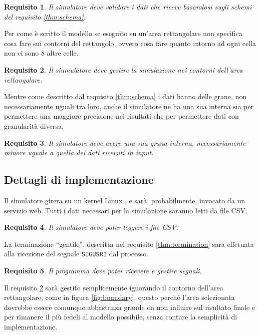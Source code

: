 \documentclass[draft]{article}
\newcommand{\eng}[1]{\foreignlanguage{english}{#1}} %
\newtheorem{requirement}{Requisito}
\begin{document}
\begin{requirement}
Il simulatore deve validare i dati che riceve basandosi sugli schemi del
requisito \ref{thm:schema}.
\end{requirement}

Per come è scritto il modello se eseguito su un'area rettangolare non specifica
cosa fare sui contorni del rettangolo, ovvero cosa fare quanto intorno ad ogni
cella non ci sono 8 altre celle.

\begin{requirement}\label{thm:boundary}
Il siumulatore deve gestire la simulazione nei contorni dell'area rettangolare.
\end{requirement}

Mentre come descritto dal requisito \ref{thm:schema} i dati hanno delle grane,
non necessariamente uguali tra loro, anche il simulatore ne ha una sua interna
sia per permettere una maggiore precisione nei risultati che per permettere dati
con granularità diversa.

\begin{requirement}\label{thm:grain}
Il simulatore deve avere una sua grana interna, necessariamente minore uguale a
quella dei dati ricevuti in \eng{input}.
\end{requirement}

\subsection{Dettagli di implementazione}

Il simulatore girera su un \eng{kernel} Linux \cite{kern}, e sarà,
probabilmente, invocato da un servizio \eng{web}. Tutti i dati necessari per la
simulazione saranno letti da \eng{file} CSV.

\begin{requirement}
Il simulatore deve poter leggere i \eng{file} CSV.
\end{requirement}

La terminazione ``gentile'', descritta nel requisito \ref{thm:termination} sara
effetuata alla ricezione del segnale \texttt{SIGUSR1} dal processo.

\begin{requirement}
Il programma deve poter ricevere e gestire segnali.
\end{requirement}

Il requisito \ref{thm:boundary} sarà gestito semplicemente ignorando il contorno
dell'area rettangolare, come in figura \ref{fig:boundary}, questo perché l'area
selezionata dovrebbe essere comunque abbastanza grande da non influire sul
risultato finale e per rimanere il più fedeli al modello possibile, senza
contare la semplicità di implementazione.
\end{document}
